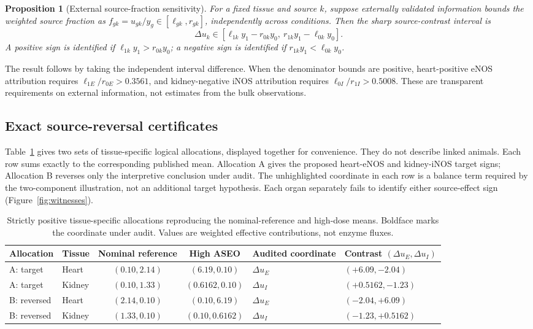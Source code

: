 \documentclass[11pt]{article}
\newtheorem{proposition}{Proposition}
\begin{document}
\begin{proposition}[External source-fraction sensitivity]
For a fixed tissue and source $k$, suppose externally validated information bounds the weighted source fraction as $f_{gk}=u_{gk}/y_g\in[\ell_{gk},r_{gk}]$, independently across conditions. Then the sharp source-contrast interval is
\[
\Delta u_k\in[\ell_{1k}y_1-r_{0k}y_0,\ r_{1k}y_1-\ell_{0k}y_0].
\]
A positive sign is identified if $\ell_{1k}y_1>r_{0k}y_0$; a negative sign is identified if $r_{1k}y_1<\ell_{0k}y_0$.
\end{proposition}

The result follows by taking the independent interval difference. When the denominator bounds are positive, heart-positive eNOS attribution requires $\ell_{1E}/r_{0E}>0.3561$, and kidney-negative iNOS attribution requires $\ell_{0I}/r_{1I}>0.5008$. These are transparent requirements on external information, not estimates from the bulk observations.

\subsection{Exact source-reversal certificates}

Table~\ref{tab:witnesses} gives two sets of tissue-specific logical allocations, displayed together for convenience. They do not describe linked animals. Each row sums exactly to the corresponding published mean. Allocation A gives the proposed heart-eNOS and kidney-iNOS target signs; Allocation B reverses only the interpretive conclusion under audit. The unhighlighted coordinate in each row is a balance term required by the two-component illustration, not an additional target hypothesis. Each organ separately fails to identify either source-effect sign (Figure~\ref{fig:witnesses}).

\begin{table}[htbp]
\centering
\caption{Strictly positive tissue-specific allocations reproducing the nominal-reference and high-dose means. Boldface marks the coordinate under audit. Values are weighted effective contributions, not enzyme fluxes.}
\label{tab:witnesses}
\small
\begin{tabularx}{\textwidth}{>{\raggedright\arraybackslash}p{}lcc>{\raggedright\arraybackslash}p{}>{\raggedright\arraybackslash}X}
\toprule
Allocation & Tissue & Nominal reference & High ASEO & Audited coordinate & Contrast $(\Delta u_E,\Delta u_I)$ \\
\midrule
A: target & Heart & $(0.10,2.14)$ & $(6.19,0.10)$ & $\Delta u_E$ & $(\mathbf{+6.09},-2.04)$ \\
A: target & Kidney & $(0.10,1.33)$ & $(0.6162,0.10)$ & $\Delta u_I$ & $(+0.5162,\mathbf{-1.23})$ \\
B: reversed & Heart & $(2.14,0.10)$ & $(0.10,6.19)$ & $\Delta u_E$ & $(\mathbf{-2.04},+6.09)$ \\
B: reversed & Kidney & $(1.33,0.10)$ & $(0.10,0.6162)$ & $\Delta u_I$ & $(-1.23,\mathbf{+0.5162})$ \\
\bottomrule
\end{tabularx}
\end{table}
\end{document}
